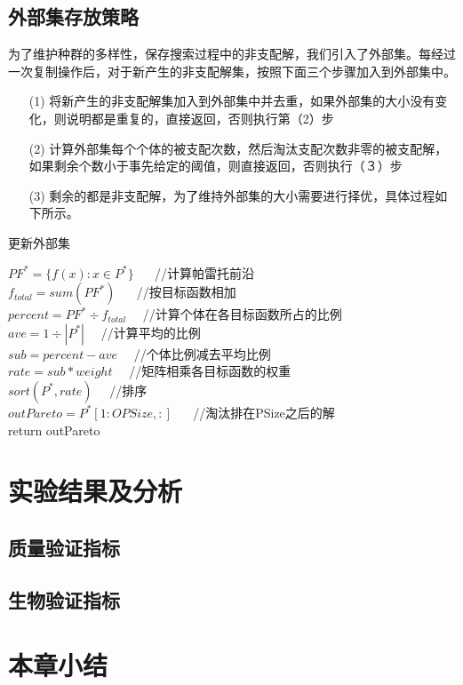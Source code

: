     \subsection{外部集存放策略}
    为了维护种群的多样性，保存搜索过程中的非支配解，我们引入了外部集。每经过一次复制操作后，对于新产生的非支配解集，按照下面三个步骤加入到外部集中。
    \begin{enumerate}
       \item[(1)] 将新产生的非支配解集加入到外部集中并去重，如果外部集的大小没有变化，则说明都是重复的，直接返回，否则执行第（2）步
       \item[(2)] 计算外部集每个个体的被支配次数，然后淘汰支配次数非零的被支配解，如果剩余个数小于事先给定的阈值，则直接返回，否则执行（３）步
       \item[(3)] 剩余的都是非支配解，为了维持外部集的大小需要进行择优，具体过程如下所示。
    \end{enumerate} 
    \begin{algorithm}[htbp]
        \caption{更新外部集} \label{alg:updatePareto}
        $PF^*= \{f(x):x\in P^*\}$ 　 //计算帕雷托前沿 \\
        $f_{total} = sum(PF^*)$  　 //按目标函数相加\\
        $percent = PF^* \div　f_{total} $　 //计算个体在各目标函数所占的比例\\
        $ave = 1 \div |P^*|$　 //计算平均的比例\\
        $sub = percent - ave$　 //个体比例减去平均比例 \\
        $rate = sub \ast weight$　 //矩阵相乘各目标函数的权重\\
        $sort(P^*, rate)$　 //排序\\
        $outPareto = P^*[1:OPSize,:]$ 　 //淘汰排在PSize之后的解\\
        return outPareto
    \end{algorithm}
\section{实验结果及分析}
    \subsection{质量验证指标}

    \subsection{生物验证指标}

\section{本章小结}
